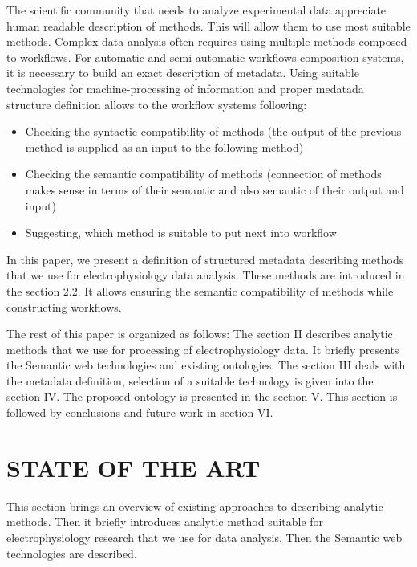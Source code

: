 \documentclass[a4paper,twoside]{article}
\begin{document}
The scientific community that needs to analyze experimental data appreciate human readable description of methods. This will allow them to use most suitable methods. Complex data analysis often requires using multiple methods composed to workflows. For automatic and semi-automatic workflows composition systems, it is necessary to build an exact description of metadata. Using suitable technologies for machine-processing of information and proper medatada structure definition allows to the workflow systems following:
\begin{itemize}
	\item Checking the syntactic compatibility of methods (the output of the previous method is supplied as an input to the following method)
	
	\item Checking the semantic compatibility of methods (connection of methods makes sense in terms of their semantic and also semantic of their output and input)
	
	\item Suggesting, which method is suitable to put next into workflow
	
\end{itemize}

In this paper, we present a definition of structured metadata describing methods that we use for electrophysiology data analysis. These methods are introduced in the section 2.2. It allows ensuring the semantic compatibility of methods while constructing workflows.

The rest of this paper is organized as follows: The section II describes analytic methods that we use for processing of electrophysiology data. It briefly presents the Semantic web technologies and existing ontologies. The section III deals with the metadata definition, selection of a suitable technology is given into the section IV. The proposed ontology is presented in the section V. This section is followed by conclusions and future work in section VI.

\section{\uppercase{State of the Art}}

\noindent This section brings an overview of existing approaches to describing analytic methods. Then it briefly introduces analytic method suitable for electrophysiology research that we use for data analysis. Then the Semantic web technologies are described.
\end{document}
